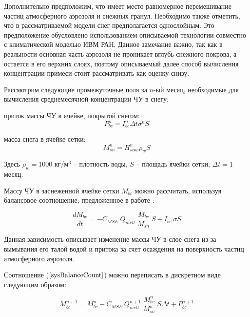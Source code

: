 \documentclass[a4paper, fontsize=14pt]{scrartcl}
\begin{document}
Дополнительно предположим, что имеет место равномерное перемешивание частиц атмосферного аэрозоля и снежных гранул. Необходимо также отметить, что в рассматриваемой модели снег предполагается однослойным. Это предположение обусловлено использованием описываемой технологии совместно с климатической моделью ИВМ РАН. Данное замечание важно, так как в реальности основная часть аэрозоля не проникает вглубь снежного покрова, а остается в его верхних слоях, поэтому описываемый далее способ вычисления концентрации примеси стоит рассматривать как оценку снизу.

\newpage
Рассмотрим следующие промежуточные поля за $n$-ый месяц, необходимые для вычисления среднемесячной концентрации ЧУ в снегу: 

приток массы ЧУ в ячейке, покрытой снегом:
    \begin{equation}
        P_{bc}^n = I_{bc}^n \Delta t \sigma^n S   \label{sys}
    \end{equation}

масса снега в ячейке сетки:
    \begin{equation}
        M_{sn}^n = H_{snw}^n \rho_w S   \label{sys}
    \end{equation}

Здесь $\rho_w = 1000$ кг/м$^3$ -- плотность воды, $S$ -- площадь ячейки сетки, $\Delta t = 1$ месяц.
    
Массу ЧУ в заснеженной ячейке сетки $M_{bc}$ можно рассчитать, используя балансовое соотношение, предложенное в работе \cite{Flanner2007}:

\begin{equation}
    \dfrac{d M_{bc}}{d t} = - C_{MSE} ~ Q_{melt} ~ \dfrac{M_{bc}}{M_{sn}} ~ S + I_{bc} ~ \sigma S     \label{sysBalanceCount}
\end{equation}

Данная зависимость описывает изменение массы ЧУ в слое снега из-за вымывания его талой водой и притока за счет осаждения на поверхность частиц атмосферного аэрозоля. 

Соотношение ($\ref{sysBalanceCount}$) можно переписать в дискретном виде следующим образом:

\begin{equation}
   M_{bc}^{n+1} = M_{bc}^n - C_{MSE} ~ Q_{melt}^{n+1} ~ \dfrac{M_{bc}^n}{M_{sn}^n} ~ S \Delta t + P_{bc}^{n+1}     \label{sysBalance}
\end{equation}
\end{document}
